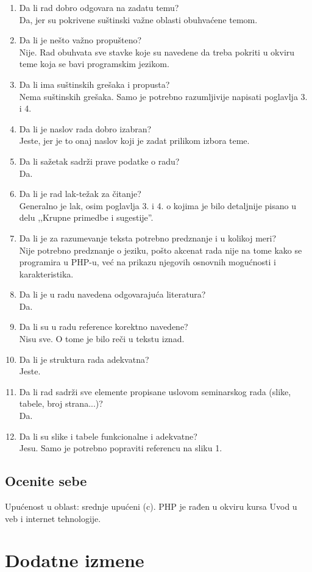 \documentclass[a4paper]{report}
\begin{document}
\begin{enumerate}
\item Da li rad dobro odgovara na zadatu temu?\\ Da, jer su pokrivene suštinski važne oblasti obuhvaćene temom.
\item Da li je nešto važno propušteno?\\ Nije. Rad obuhvata sve stavke koje su navedene da treba pokriti u okviru teme koja se bavi programskim jezikom.
\item Da li ima suštinskih grešaka i propusta?\\ Nema suštinskih grešaka. Samo je potrebno razumljivije napisati poglavlja 3. i 4.
\item Da li je naslov rada dobro izabran?\\ Jeste, jer je to onaj naslov koji je zadat prilikom izbora teme.
\item Da li sažetak sadrži prave podatke o radu?\\ Da.
\item Da li je rad lak-težak za čitanje?\\ Generalno je lak, osim poglavlja 3. i 4. o kojima je bilo detaljnije pisano u delu ,,Krupne primedbe i sugestije''.
\item Da li je za razumevanje teksta potrebno predznanje i u kolikoj meri?\\ Nije potrebno predznanje o jeziku, pošto akcenat rada nije na tome kako se programira u PHP-u, već na prikazu njegovih osnovnih mogućnosti i karakteristika.
\item Da li je u radu navedena odgovarajuća literatura?\\ Da.
\item Da li su u radu reference korektno navedene?\\ Nisu sve. O tome je bilo reči u tekstu iznad.
\item Da li je struktura rada adekvatna?\\ Jeste.
\item Da li rad sadrži sve elemente propisane uslovom seminarskog rada (slike, tabele, broj strana...)?\\ Da.
\item Da li su slike i tabele funkcionalne i adekvatne?\\ Jesu. Samo je potrebno popraviti referencu na sliku 1.
\end{enumerate}

\section{Ocenite sebe}

Upućenost u oblast: srednje upućeni (c). PHP je rađen u okviru kursa Uvod u veb i internet tehnologije.



\chapter{Dodatne izmene}
\end{document}
